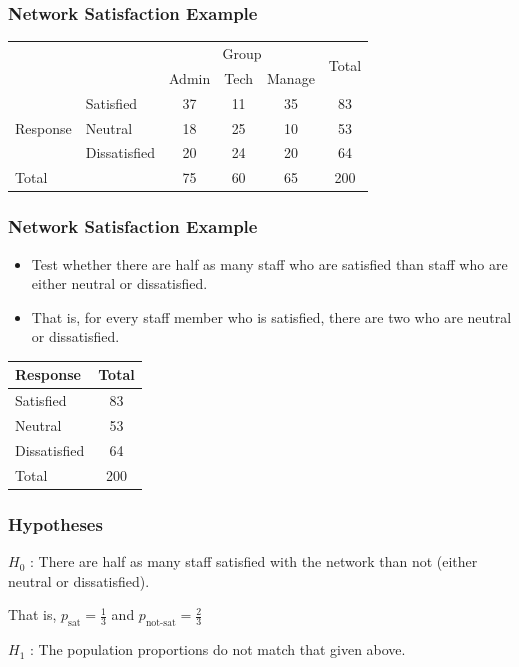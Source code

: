 \documentclass[12pt]{beamer}
\begin{document}
\begin{frame}
	\frametitle{Network Satisfaction Example}
	
	\medskip
		\centering
	\begin{tabular}{llcccc}

		\toprule
		& & \multicolumn{3}{c}{Group} &\multirow{2}{*}{Total}  \\
		& & Admin & Tech & Manage &\\
		\midrule
		\multirow{3}{*}{Response} & Satisfied & 37 & 11 & 35 & 83 \\
		& Neutral & 18 & 25 & 10 & 53 \\
		& Dissatisfied & 20 & 24 & 20 & 64 \\
		\midrule
		\multicolumn{2}{l}{Total} & 75 & 60 & 65 & 200 \\
		\bottomrule
	\end{tabular}
	
\end{frame}
\begin{frame}
	\frametitle{Network Satisfaction Example}
	
	\begin{itemize}[label={\color{blue}$\blacktriangleright$}]
		\item Test whether there are half as many staff who are satisfied than staff who are either neutral or dissatisfied.
		
		\item That is, for every staff member who is satisfied, there are two who are neutral or dissatisfied.
	\end{itemize}
	
	\medskip
	
	\begin{center}
		\begin{tabular}{lc}
			\toprule
			Response & Total \\
			\midrule
			Satisfied & 83 \\
			Neutral & 53 \\
			Dissatisfied & 64 \\
			\midrule
			Total & 200 \\
			\bottomrule
		\end{tabular}
	\end{center}
	
\end{frame}
\begin{frame}
	\frametitle{Hypotheses}
	
	$H_0$ : There are half as many staff satisfied with the network than not (either neutral or dissatisfied).
	
	\medskip
	\hspace*{1em} That is, \quad $p_\text{sat} = \frac{1}{3}$ \quad and \quad $p_\text{not-sat} = \frac{2}{3}$
	
	\medskip
	$H_1$ : The population proportions do not match that given above.
	
\end{frame}
\end{document}
